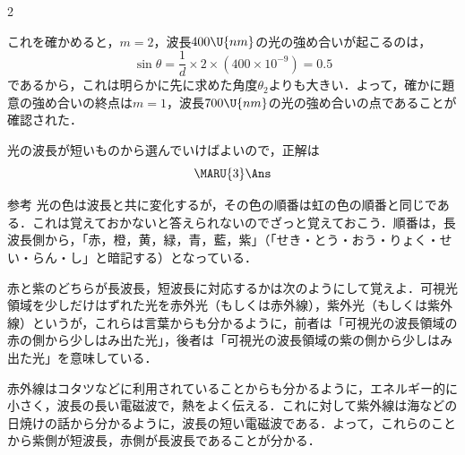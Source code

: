 \begin{multicols}{2}
\begin{komon}
\begin{chuu}
       これを確かめると，$m=2$，波長$400\U{nm}$の光の強め合いが起こるのは，
       \[\sin\theta=\frac{1}{d}\times 2\times(400\times 10^{-9})=0.5\]
       であるから，これは明らかに先に求めた角度$\theta_2$よりも大きい．よって，確かに題意の強め合いの終点は$m=1$，波長$700\U{nm}$の光の強め合いの点であることが確認された．
       \end{chuu}
 光の波長が短いものから選んでいけばよいので，正解は
       \[\MARU{3}\Ans\]
       \begin{bsHosoku}{参考}
       光の色は波長と共に変化するが，その色の順番は虹の色の順番と同じである．これは覚えておかないと答えられないのでざっと覚えておこう．順番は，長波長側から，「赤，橙，黄，緑，青，藍，紫」（「せき・とう・おう・りょく・せい・らん・し」と暗記する）となっている．

       赤と紫のどちらが長波長，短波長に対応するかは次のようにして覚えよ．可視光領域を少しだけはずれた光を赤外光（もしくは赤外線），紫外光（もしくは紫外線）というが，これらは言葉からも分かるように，前者は「可視光の波長領域の赤の側から少しはみ出た光」，後者は「可視光の波長領域の紫の側から少しはみ出た光」を意味している．

       赤外線はコタツなどに利用されていることからも分かるように，エネルギー的に小さく，波長の長い電磁波で，熱をよく伝える．これに対して紫外線は海などの日焼けの話から分かるように，波長の短い電磁波である．よって，これらのことから紫側が短波長，赤側が長波長であることが分かる．
       \end{bsHosoku}
\end{komon}

\end{multicols}
